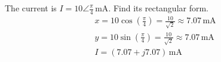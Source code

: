 \begin{exempel}
The current is $I = 10\angle\frac{\pi}{4}\,\text{mA}$. Find its rectangular form.
\begin{gather*}
  x = 10\cos\left(\frac{\pi}{4}\right) = \frac{10}{\sqrt{2}} \approx 7.07\,\text{mA} \\
  y = 10\sin\left(\frac{\pi}{4}\right) = \frac{10}{\sqrt{2}} \approx 7.07\,\text{mA} \\
  I = (7.07 + j7.07)\,\text{mA}
\end{gather*}
\end{exempel}
